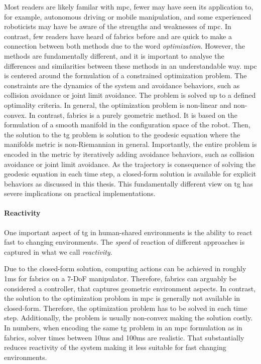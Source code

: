 Most readers are likely familar with \acl{mpc}, fewer may have seen its application
to, for example, autonomous driving or mobile manipulation, and some 
experienced roboticists may have be aware of the strengths and weaknesses of
\ac{mpc}. In contrast, few readers have heard of \acf{fabrics} before and are 
quick to make a connection between both methods due to the word
\textit{optimization}. However, the methods are
fundamentally different,
and it is important to analyse the differences and similarities between
these methods in an understandable way.
\ac{mpc} is centered around the
formulation of a constrained optimization problem. The constraints are
the dynamics of the system and avoidance behaviors, such as collision avoidance
or joint limit avoidance. The problem is solved up to a defined optimality 
criteria. In general, the optimization problem is non-linear and non-convex.
In contrast, \ac{fabrics} is a purely geometric method. It is based on the
formulation of a smooth manifold in the configuration space of the robot.
Then, the solution to the \ac{tg} problem is solution to the geodesic equation
where the manifolds metric is non-Riemannian in general. Importantly, the entire
problem is encoded in the metric by iteratively adding avoidance
behaviors, such as collision avoidance or joint limit avoidance. As the
trajectory is consequence of solving the geodesic equation in each time step, a
closed-form solution is available for explicit behaviors as discussed in this
thesis.
This fundamentally different view on \ac{tg} has severe implications on
practical implementations.

\paragraph{Reactivity}
\label{par:discussion_reactivity}

One important aspect of \ac{tg} in human-shared environments is the ability to
react fast to changing environments. The \textit{speed} of reaction
of different approaches is captured in what we call \textit{reactivity}.

Due to the closed-form solution, computing actions can be
achieved in roughly 1ms for \ac{fabrics} on a 7-DoF
manipulator. Therefore, \ac{fabrics} can arguably be
considered a controller, that captures geometric environment
aspects. In contrast, the solution to the optimization
problom in \ac{mpc} is generally not available in
closed-form. Therefore, the optimization problem has to be 
solved in each time step. Additionally, the problem is
usually non-convex making the solution costly. In numbers,
when encoding the same \ac{tg} problem in an \ac{mpc}
formulation as in \ac{fabrics}, solver times between 10ms
and 100ms are realistic. That substantially reduces
reactivity of the system making it less suitable for fast
changing environments.

